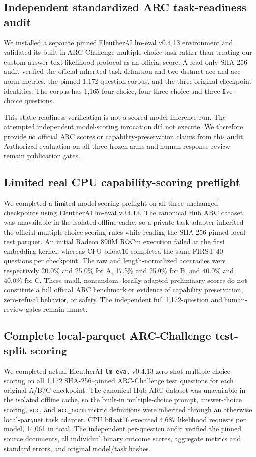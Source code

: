\documentclass[11pt]{article}
\begin{document}
\subsection{Independent standardized ARC task-readiness audit}
We installed a separate pinned EleutherAI lm-eval v0.4.13
environment and validated its built-in ARC-Challenge
multiple-choice task rather than treating our custom
answer-text likelihood protocol as an official score.
A read-only SHA-256 audit verified the official inherited
task definition and two distinct acc and acc-norm metrics,
the pinned 1,172-question corpus, and the three original
checkpoint identities. The corpus has 1,165 four-choice,
four three-choice and three five-choice questions.

This static readiness verification is not a scored model
inference run. The attempted independent model-scoring
invocation did not execute. We therefore provide no official
ARC scores or capability-preservation claims from this
audit. Authorized evaluation on all three frozen arms and
human response review remain publication gates.

\subsection{Limited real CPU capability-scoring preflight}
We completed a limited model-scoring preflight on all three
unchanged checkpoints using EleutherAI lm-eval v0.4.13.
The canonical Hub ARC dataset was unavailable in the isolated
offline cache, so a private task adapter inherited the official
multiple-choice scoring rules while reading the SHA-256-pinned
local test parquet. An initial Radeon 890M ROCm execution
failed at the first embedding kernel, whereas CPU bfloat16
completed the same FIRST 40 questions per checkpoint.
The raw and length-normalized accuracies were respectively
20.0\% and 25.0\% for A, 17.5\% and 25.0\% for B,
and 40.0\% and 40.0\% for C. These small, nonrandom,
locally adapted preliminary scores do not constitute a full
official ARC benchmark or evidence of capability preservation,
zero-refusal behavior, or safety. The independent full
1,172-question and human-review gates remain unmet.

\subsection{Complete local-parquet ARC-Challenge test-split scoring}
We completed actual EleutherAI \texttt{lm-eval} v0.4.13
zero-shot multiple-choice scoring on all 1,172
SHA-256--pinned ARC-Challenge test questions for each
original A/B/C checkpoint. The canonical Hub ARC dataset
was unavailable in the isolated offline cache, so the
built-in multiple-choice prompt, answer-choice scoring,
\texttt{acc}, and \texttt{acc\_norm} metric definitions
were inherited through an otherwise local-parquet
task adapter. CPU bfloat16 executed 4,687 likelihood
requests per model, 14,061 in total. The independent
per-question audit verified the pinned source documents,
all individual binary outcome scores, aggregate metrics
and standard errors, and original model/task hashes.
\end{document}
